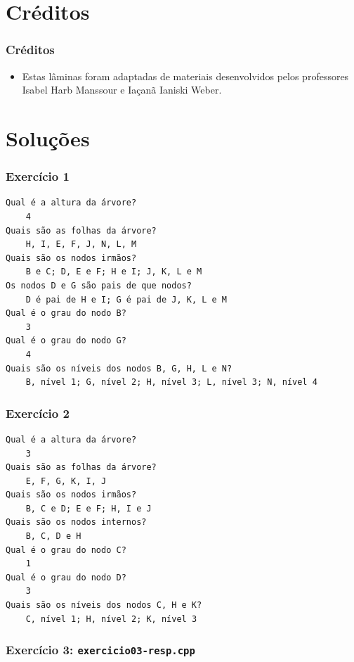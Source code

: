 \documentclass[aspectratio=169]{beamer}
\begin{document}
\section{Créditos}

\begin{frame}\frametitle{Créditos}
\begin{itemize}
	\item Estas lâminas foram adaptadas de materiais desenvolvidos pelos professores Isabel Harb Manssour e Iaçanã Ianiski Weber.
\end{itemize}
\end{frame}

\section{Soluções}

\begin{frame}[fragile]\frametitle{Exercício 1}
\small{
\begin{verbatim}
Qual é a altura da árvore?
    4
Quais são as folhas da árvore?
    H, I, E, F, J, N, L, M
Quais são os nodos irmãos?
    B e C; D, E e F; H e I; J, K, L e M
Os nodos D e G são pais de que nodos?
    D é pai de H e I; G é pai de J, K, L e M
Qual é o grau do nodo B?
    3
Qual é o grau do nodo G?
    4
Quais são os níveis dos nodos B, G, H, L e N? 
    B, nível 1; G, nível 2; H, nível 3; L, nível 3; N, nível 4
\end{verbatim}
}
\end{frame}

\begin{frame}[fragile]\frametitle{Exercício 2}
\small{
\begin{verbatim}
Qual é a altura da árvore?
    3
Quais são as folhas da árvore?
    E, F, G, K, I, J
Quais são os nodos irmãos?
    B, C e D; E e F; H, I e J
Quais são os nodos internos?
    B, C, D e H
Qual é o grau do nodo C?
    1
Qual é o grau do nodo D?
    3
Quais são os níveis dos nodos C, H e K?
    C, nível 1; H, nível 2; K, nível 3
\end{verbatim}
}
\end{frame}

\begin{frame}[fragile]\frametitle{Exercício 3: \texttt{exercicio03-resp.cpp}}
\fontsize{3pt}{5pt}\selectfont{

}
\end{frame}
\end{document}
